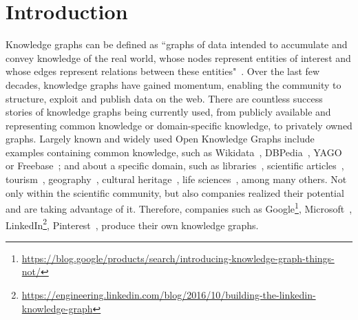 \chapter{Introduction}
\label{chapter:intro}




Knowledge graphs can be defined as ``graphs of data intended to accumulate and convey knowledge of the real world, whose nodes represent entities of interest and whose edges represent relations between these entities"~\parencite{hogan2021kg}. 
Over the last few decades, knowledge graphs have gained momentum, enabling the community to structure, exploit and publish data on the web. 
There are countless success stories of knowledge graphs being currently used, from publicly available and representing common knowledge or domain-specific knowledge, to privately owned graphs. 
Largely known and widely used Open Knowledge Graphs include examples containing common knowledge, such as Wikidata~\parencite{erxleben2014introducing}, DBPedia~\parencite{lehmann2015dbpedia}, YAGO~\parencite{pellissier2020yago} or Freebase~\parencite{bollacker2007freebase}; 
and about a specific domain, such as 
libraries~\parencite{vila2013datos}, 
scientific articles~\parencite{stocker2023orkg}, 
tourism~\parencite{karle2018building,alonso2018rioja}, 
geography~\parencite{stadler2012linkedgeodata}, 
cultural heritage~\parencite{carriero2019arco}, 
life sciences~\parencite{dumontier2014bio2rdf,pinero2020disgenet}, among many others. 
Not only within the scientific community, but also companies realized their potential and are taking advantage of it. Therefore, companies such as
Google\footnote{\url{https://blog.google/products/search/introducing-knowledge-graph-things-not/}},
Microsoft~\parencite{farber2019microsoft},
LinkedIn\footnote{\url{https://engineering.linkedin.com/blog/2016/10/building-the-linkedin-knowledge-graph}}, 
Pinterest~\parencite{goncalves2019pinterest},
produce their own knowledge graphs. 


